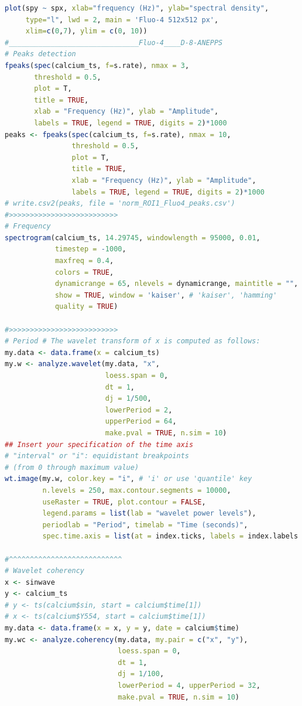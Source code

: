 \documentclass{biophys-new}
\begin{document}
\begin{lstlisting}[language=R]
plot(spy ~ spx, xlab="frequency (Hz)", ylab="spectral density",
     type="l", lwd = 2, main = 'Fluo-4 512x512 px',
     xlim=c(0,7), ylim = c(0, 10))
#_______________________________Fluo-4____D-8-ANEPPS
# Peaks detection
fpeaks(spec(calcium_ts, f=s.rate), nmax = 3,
       threshold = 0.5,
       plot = T,
       title = TRUE,
       xlab = "Frequency (Hz)", ylab = "Amplitude",
       labels = TRUE, legend = TRUE, digits = 2)*1000
peaks <- fpeaks(spec(calcium_ts, f=s.rate), nmax = 10,
                threshold = 0.5,
                plot = T,
                title = TRUE,
                xlab = "Frequency (Hz)", ylab = "Amplitude",
                labels = TRUE, legend = TRUE, digits = 2)*1000
# write.csv2(peaks, file = 'norm_ROI1_Fluo4_peaks.csv')
#>>>>>>>>>>>>>>>>>>>>>>>>>>
# Frequency
spectrogram(calcium_ts, 14.29745, windowlength = 95000, 0.01,
            timestep = -1000,
            maxfreq = 0.4,
            colors = TRUE,
            dynamicrange = 65, nlevels = dynamicrange, maintitle = "",
            show = TRUE, window = 'kaiser', # 'kaiser', 'hamming'
            quality = TRUE)

#>>>>>>>>>>>>>>>>>>>>>>>>>>
# Period # The wavelet transform of x is computed as follows:
my.data <- data.frame(x = calcium_ts)
my.w <- analyze.wavelet(my.data, "x",
                        loess.span = 0,
                        dt = 1,
                        dj = 1/500,
                        lowerPeriod = 2,
                        upperPeriod = 64,
                        make.pval = TRUE, n.sim = 10)
## Insert your specification of the time axis
# "interval" or "i": equidistant breakpoints
# (from 0 through maximum value)
wt.image(my.w, color.key = "i", # 'i' or use 'quantile' key
         n.levels = 250, max.contour.segments = 10000,
         useRaster = TRUE, plot.contour = FALSE,
         legend.params = list(lab = "wavelet power levels"),
         periodlab = "Period", timelab = "Time (seconds)",
         spec.time.axis = list(at = index.ticks, labels = index.labels.rounded))

#^^^^^^^^^^^^^^^^^^^^^^^^^^^
# Wavelet coherency
x <- sinwave
y <- calcium_ts
# y <- ts(calcium$sin, start = calcium$time[1])
# x <- ts(calcium$Y554, start = calcium$time[1])
my.data <- data.frame(x = x, y = y, date = calcium$time)
my.wc <- analyze.coherency(my.data, my.pair = c("x", "y"),
                           loess.span = 0,
                           dt = 1,
                           dj = 1/100,
                           lowerPeriod = 4, upperPeriod = 32,
                           make.pval = TRUE, n.sim = 10)


\end{lstlisting}
\end{document}

